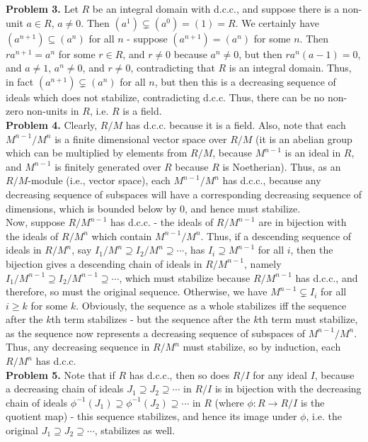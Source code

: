 \documentclass[11pt]{article}
\newcommand{\num}[1]{\noindent \textbf{#1}}
\theoremstyle{definition}
\begin{document}
\num{Problem 3.} Let $R$ be an integral domain with d.c.c., and suppose there is a non-unit $a\in R$, $a\neq0$. Then $(a^1)\subsetneq (a^0)=(1)=R$. We certainly have $(a^{n+1})\subseteq(a^n)$ for all $n$ - suppose $(a^{n+1})=(a^n)$ for some $n$. Then $ra^{n+1}=a^n$ for some $r\in R$, and $r\neq0$ because $a^n\neq0$, but then $ra^n(a-1)=0$, and $a\neq1$, $a^n\neq0$, and $r\neq0$, contradicting that $R$ is an integral domain. Thus, in fact $(a^{n+1})\subsetneq(a^n)$ for all $n$, but then this is a decreasing sequence of ideals which does not stabilize, contradicting d.c.c. Thus, there can be no non-zero non-units in $R$, i.e. $R$ is a field.    \\

\num{Problem 4.} Clearly, $R/M$ has d.c.c. because it is a field. Also, note that each $M^{n-1}/M^n$ is a finite dimensional vector space over $R/M$ (it is an abelian group which can be multiplied by elements from $R/M$, because $M^{n-1}$ is an ideal in $R$, and $M^{n-1}$ is finitely generated over $R$ because $R$ is Noetherian). Thus, as an $R/M$-module (i.e., vector space), each $M^{n-1}/M^n$ has d.c.c., because any decreasing sequence of subspaces will have a corresponding decreasing sequence of dimensions, which is bounded below by 0, and hence must stabilize. \\

\noindent Now, suppose $R/M^{n-1}$ has d.c.c. - the ideals of $R/M^{n-1}$ are in bijection with the ideals of $R/M^n$ which contain $M^{n-1}/M^n$. Thus, if a descending sequence of ideals in $R/M^n$, say $I_1/M^n\supseteq I_2/M^n\supseteq \cdots$, has $I_i\supseteq M^{n-1}$ for all $i$, then the bijection gives a descending chain of ideals in $R/M^{n-1}$, namely $I_1/M^{n-1}\supseteq I_2/M^{n-1}\supseteq\cdots$, which must stabilize because $R/M^{n-1}$ has d.c.c., and therefore, so must the original sequence. Otherwise, we have $M^{n-1}\subsetneq I_i$ for all $i\geq k$ for some $k$. Obviously, the sequence as a whole stabilizes iff the sequence after the $k$th term stabilizes - but the sequence after the $k$th term must stabilize, as the sequence now represents a decreasing sequence of subspaces of $M^{n-1}/M^n$. Thus, any decreasing sequence in $R/M^n$ must stabilize, so by induction, each $R/M^n$ has d.c.c.     \\

\num{Problem 5.} Note that if $R$ has d.c.c., then so does $R/I$ for any ideal $I$, because a decreasing chain of ideals $J_1\supseteq J_2\supseteq\cdots$ in $R/I$ is in bijection with the decreasing chain of ideals $\phi^{-1}(J_1)\supseteq\phi^{-1}(J_2)\supseteq\cdots$ in $R$ (where $\phi:R\rightarrow R/I$ is the quotient map) - this sequence stabilizes, and hence its image under $\phi$, i.e. the original $J_1\supseteq J_2\supseteq\cdots$, stabilizes as well. \\
\end{document}
